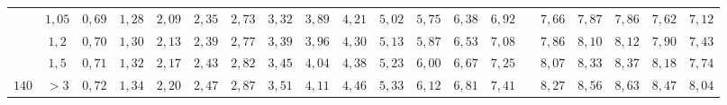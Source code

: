 \begin{table}[]
{\begin{tabular}{|c|c|c|c|c|c|c|c|c|c|c|c|c|c|c|c|c|c|c|c|}
                        & $1,05$                                                                              & \cellcolor[HTML]{FFCCC9}$0,69$ & \cellcolor[HTML]{FFCCC9}$1,28$ & \cellcolor[HTML]{FD6864}$2,09$ & \cellcolor[HTML]{FD6864}$2,35$ & \cellcolor[HTML]{FD6864}$2,73$ & \cellcolor[HTML]{FD6864}$3,32$ & \cellcolor[HTML]{FE0000}$3,89$ & \cellcolor[HTML]{FE0000}$4,21$ & \cellcolor[HTML]{FE0000}$5,02$ & \cellcolor[HTML]{CB0000}$5,75$ & \cellcolor[HTML]{9A0000}$6,38$ & \cellcolor[HTML]{9A0000}$6,92$ & \cellcolor[HTML]{F8A102}{\color[HTML]{333333} $7,35$} & \cellcolor[HTML]{F8A102}$7,66$ & \cellcolor[HTML]{F56B00}$7,87$ & \cellcolor[HTML]{CE6301}$7,86$ & \cellcolor[HTML]{963400}$7,62$ & \cellcolor[HTML]{963400}$7,12$ \\ \cline{2-20} 
                        & $1,2$                                                                               & \cellcolor[HTML]{FFCCC9}$0,70$ & \cellcolor[HTML]{FFCCC9}$1,30$ & \cellcolor[HTML]{FD6864}$2,13$ & \cellcolor[HTML]{FD6864}$2,39$ & \cellcolor[HTML]{FD6864}$2,77$ & \cellcolor[HTML]{FD6864}$3,39$ & \cellcolor[HTML]{FE0000}$3,96$ & \cellcolor[HTML]{FE0000}$4,30$ & \cellcolor[HTML]{FE0000}$5,13$ & \cellcolor[HTML]{CB0000}$5,87$ & \cellcolor[HTML]{9A0000}$6,53$ & \cellcolor[HTML]{9A0000}$7,08$ & \cellcolor[HTML]{F8A102}{\color[HTML]{333333} $7,53$} & \cellcolor[HTML]{F8A102}$7,86$ & \cellcolor[HTML]{F56B00}$8,10$ & \cellcolor[HTML]{CE6301}$8,12$ & \cellcolor[HTML]{963400}$7,90$ & \cellcolor[HTML]{963400}$7,43$ \\ \cline{2-20} 
                        & $1,5$                                                                               & \cellcolor[HTML]{FFCCC9}$0,71$ & \cellcolor[HTML]{FFCCC9}$1,32$ & \cellcolor[HTML]{FD6864}$2,17$ & \cellcolor[HTML]{FD6864}$2,43$ & \cellcolor[HTML]{FD6864}$2,82$ & \cellcolor[HTML]{FD6864}$3,45$ & \cellcolor[HTML]{FE0000}$4,04$ & \cellcolor[HTML]{FE0000}$4,38$ & \cellcolor[HTML]{FE0000}$5,23$ & \cellcolor[HTML]{CB0000}$6,00$ & \cellcolor[HTML]{9A0000}$6,67$ & \cellcolor[HTML]{9A0000}$7,25$ & \cellcolor[HTML]{F8A102}{\color[HTML]{333333} $7,72$} & \cellcolor[HTML]{F8A102}$8,07$ & \cellcolor[HTML]{F56B00}$8,33$ & \cellcolor[HTML]{CE6301}$8,37$ & \cellcolor[HTML]{963400}$8,18$ & \cellcolor[HTML]{963400}$7,74$ \\ \cline{2-20} 
\multirow{-5}{*}{$140$} & $>3$                                                                                & \cellcolor[HTML]{FFCCC9}$0,72$ & \cellcolor[HTML]{FFCCC9}$1,34$ & \cellcolor[HTML]{FD6864}$2,20$ & \cellcolor[HTML]{FD6864}$2,47$ & \cellcolor[HTML]{FD6864}$2,87$ & \cellcolor[HTML]{FD6864}$3,51$ & \cellcolor[HTML]{FE0000}$4,11$ & \cellcolor[HTML]{FE0000}$4,46$ & \cellcolor[HTML]{FE0000}$5,33$ & \cellcolor[HTML]{CB0000}$6,12$ & \cellcolor[HTML]{9A0000}$6,81$ & \cellcolor[HTML]{9A0000}$7,41$ & \cellcolor[HTML]{F8A102}{\color[HTML]{333333} $7,90$} & \cellcolor[HTML]{F8A102}$8,27$ & \cellcolor[HTML]{F56B00}$8,56$ & \cellcolor[HTML]{CE6301}$8,63$ & \cellcolor[HTML]{963400}$8,47$ & \cellcolor[HTML]{963400}$8,04$ \\ \hline

\end{tabular}}
\end{table}
